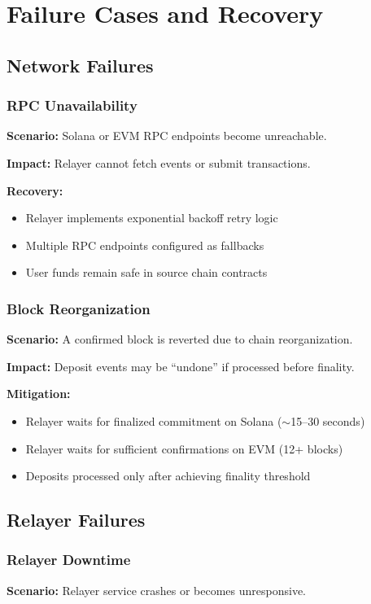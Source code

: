 \documentclass[11pt,a4paper,twoside]{article}
\begin{document}
\section{Failure Cases and Recovery}
\label{sec:failures}

\subsection{Network Failures}

\subsubsection{RPC Unavailability}
\textbf{Scenario:} Solana or EVM RPC endpoints become unreachable.

\textbf{Impact:} Relayer cannot fetch events or submit transactions.

\textbf{Recovery:}
\begin{itemize}
    \item Relayer implements exponential backoff retry logic
    \item Multiple RPC endpoints configured as fallbacks
    \item User funds remain safe in source chain contracts
\end{itemize}

\subsubsection{Block Reorganization}
\textbf{Scenario:} A confirmed block is reverted due to chain reorganization.

\textbf{Impact:} Deposit events may be ``undone'' if processed before finality.

\textbf{Mitigation:}
\begin{itemize}
    \item Relayer waits for finalized commitment on Solana ($\sim$15--30 seconds)
    \item Relayer waits for sufficient confirmations on EVM (12+ blocks)
    \item Deposits processed only after achieving finality threshold
\end{itemize}

\subsection{Relayer Failures}

\subsubsection{Relayer Downtime}
\textbf{Scenario:} Relayer service crashes or becomes unresponsive.
\end{document}
